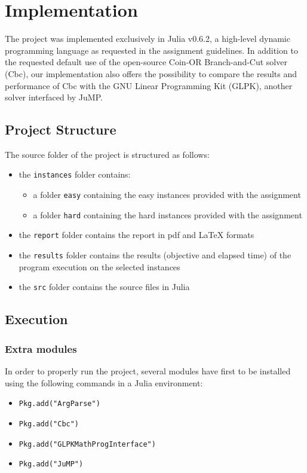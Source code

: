 \chapter{Implementation}

The project was implemented exclusively in Julia v0.6.2, a high-level dynamic programming language as requested in the assignment guidelines. In addition to the requested default use of the open-source Coin-OR Branch-and-Cut solver (Cbc), our implementation also offers the possibility to compare the results and performance of Cbc with the GNU Linear Programming Kit (GLPK), another solver interfaced by JuMP.

\section{Project Structure}

The source folder of the project is structured as follows:
\begin{itemize}
\item the \verb+instances+ folder contains:
	\begin{itemize}
	\item a folder \verb+easy+ containing the easy instances provided with the assignment
	\item a folder \verb+hard+ containing the hard instances provided with the assignment
	\end{itemize}
\item the \verb+report+ folder contains the report in pdf and LaTeX formats
\item the \verb+results+ folder contains the results (objective and elapsed time) of the program execution on the selected instances
\item the \verb+src+ folder contains the source files in Julia
\end{itemize}

\section{Execution}

\subsection{Extra modules}
In order to properly run the project, several modules have first to be installed using the following commands in a Julia environment:
\begin{itemize}
	\item \verb+Pkg.add("ArgParse")+
	\item \verb+Pkg.add("Cbc")+
	\item \verb+Pkg.add("GLPKMathProgInterface")+
	\item \verb+Pkg.add("JuMP")+
\end{itemize}

